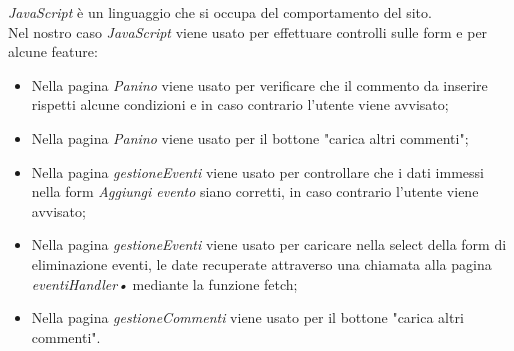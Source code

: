 \emph{JavaScript} è un linguaggio che si occupa del comportamento del sito.\\
Nel nostro caso \emph{JavaScript} viene usato per effettuare controlli sulle form e per alcune feature:
\begin{itemize}
    \item Nella pagina \emph{Panino} viene usato per verificare che il commento da inserire rispetti alcune condizioni e in caso contrario l'utente viene avvisato;
    \item Nella pagina \emph{Panino} viene usato per il bottone "carica altri commenti";
    \item Nella pagina \emph{gestioneEventi} viene usato per controllare che i dati immessi nella form \emph{Aggiungi evento} siano corretti, in caso contrario l'utente viene avvisato;
    \item Nella pagina \emph{gestioneEventi} viene usato per caricare nella select della form di eliminazione eventi, le date recuperate attraverso una chiamata alla pagina \emph{eventiHandler•} mediante la funzione fetch;
    \item Nella pagina \emph{gestioneCommenti} viene usato per il bottone "carica altri commenti".
\end{itemize}

